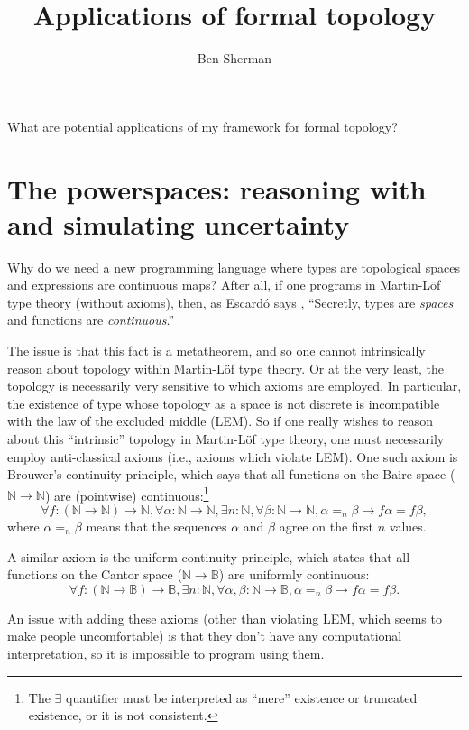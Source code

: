 \documentclass{article}           %
\title{Applications of formal topology}
\author{Ben Sherman}
\newcommand{\nat}{\mathbb{N}}
\newcommand{\bool}{\mathbb{B}}
\begin{document}
\maketitle

What are potential applications of my framework for formal topology?

\section{The powerspaces: reasoning with and simulating uncertainty}

Why do we need a new programming language where types are topological spaces and expressions are continuous maps? After all, if one programs in Martin-Löf type theory (without axioms), then, as Escardó says \cite{escardo4wft}, ``Secretly, types are \emph{spaces} and functions are \emph{continuous}.''

The issue is that this fact is a metatheorem, and so one cannot intrinsically reason about topology within Martin-Löf type theory. Or at the very least, the topology is necessarily very sensitive to which axioms are employed. In particular, the existence of type whose topology as a space is not discrete is incompatible with the law of the excluded middle (LEM). So if one really wishes to reason about this ``intrinsic'' topology in Martin-Löf type theory, one must necessarily employ anti-classical axioms (i.e., axioms which violate LEM). One such axiom is Brouwer's continuity principle, which says that all functions on the Baire space ($\nat \to \nat$) are (pointwise) continuous:\footnote{The $\exists$ quantifier must be interpreted as ``mere'' existence or truncated existence, or it is not consistent\cite{escardo2015inconsistency}.}
\[
\forall f : (\nat \to \nat) \to \nat, 
\forall \alpha : \nat \to \nat,
\exists n : \nat,
\forall \beta : \nat \to \nat,
\alpha =_n \beta
\to
f \alpha = f \beta,
\]
where $\alpha =_n \beta$ means that the sequences $\alpha$ and $\beta$ agree on the first $n$ values.

A similar axiom is the uniform continuity principle, which states that all functions on the Cantor space ($\nat \to \bool$) are uniformly continuous:
\[
\forall f : (\nat \to \bool) \to \bool,
\exists n : \nat,
\forall \alpha, \beta : \nat \to \bool,
\alpha =_n \beta
\to
f \alpha = f \beta.
\]

An issue with adding these axioms (other than violating LEM, which seems to make people uncomfortable) is that they don't have any computational interpretation, so it is impossible to program using them.
\end{document}
